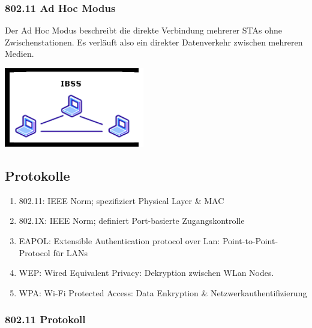 \documentclass[11pt]{article}
\begin{document}
    \subsubsection{802.11 Ad Hoc Modus}
    \begin{minipage}{0.7\textwidth}     %
        Der Ad Hoc Modus beschreibt die direkte Verbindung mehrerer STAs ohne Zwischenstationen.
        Es verläuft also ein direkter Datenverkehr zwischen mehreren Medien.
    \end{minipage}
    \begin{minipage}{0.3\textwidth}     %
        \includegraphics[width=\linewidth]{802-11_AdHoc.png}
    \end{minipage}

    \subsection{Protokolle}
    \begin{enumerate}[$\diamond$]
        \item 802.11: IEEE Norm; spezifiziert Physical Layer \& MAC
        \item 802.1X: IEEE Norm; definiert Port-basierte Zugangskontrolle
        \item EAPOL: Extensible Authentication protocol over Lan: Point-to-Point-Protocol für LANs
        \item WEP: Wired Equivalent Privacy: Dekryption zwischen WLan Nodes.
        \item WPA: Wi-Fi Protected Access: Data Enkryption \& Netzwerkauthentifizierung
    \end{enumerate}

    \subsubsection{802.11 Protokoll}
\end{document}
